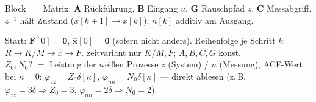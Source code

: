 \vspace{0.15em}
{\footnotesize Block $=$ Matrix: $\mathbf A$ Rückführung, $\mathbf B$ Eingang $u$,
$\mathbf G$ Rauschpfad $z$, $\mathbf C$ Messabgriff.\; $z^{-1}$ hält Zustand
($x[k{+}1]\!\to\!x[k]$); $n[k]$ additiv am Ausgang.}\par\vspace{0.2em}
\bereichende

\noindent\footnotesize
Start: $\mathbf F[0]{=}\mathbf 0$, $\hat{\mathbf x}[0]{=}\mathbf 0$ (sofern nicht anders).\;
Reihenfolge je Schritt $k$: $R\to K/M\to\hat x\to F$.\;
zeitvariant nur $K/M,F$; $A,B,C,G$ konst.\\[0.15em]
{\scshape\color{gray!65!black} $Z_0,N_0$?} $=$ Leistung der weißen Prozesse $z$ (System) / $n$ (Messung), ACF-Wert bei $\kappa{=}0$:\;
$\varphi_{zz}{=}Z_0\delta[\kappa]$, $\varphi_{nn}{=}N_0\delta[\kappa]$ — direkt ablesen
(z.\,B.\ $\varphi_{zz}{=}3\delta\Rightarrow Z_0{=}3$, $\varphi_{nn}{=}2\delta\Rightarrow N_0{=}2$).
\par\vspace{0.35em}
